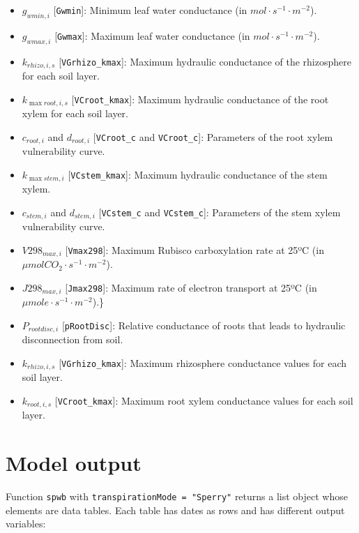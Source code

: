 \documentclass[]{book}
\providecommand{\tightlist}{%
  \setlength{\itemsep}{0pt}\setlength{\parskip}{0pt}}
\begin{document}
\begin{itemize}
\tightlist
\item
  \(g_{wmin,i}\) {[}\texttt{Gwmin}{]}: Minimum leaf water conductance (in \(mol·s^{-1}·m^{-2}\)).
\item
  \(g_{wmax,i}\) {[}\texttt{Gwmax}{]}: Maximum leaf water conductance (in \(mol·s^{-1}·m^{-2}\)).
\item
  \(k_{rhizo,i,s}\) {[}\texttt{VGrhizo\_kmax}{]}: Maximum hydraulic conductance of the rhizosphere for each soil layer.
\item
  \(k_{\max root,i,s}\) {[}\texttt{VCroot\_kmax}{]}: Maximum hydraulic conductance of the root xylem for each soil layer.
\item
  \(c_{root,i}\) and \(d_{root,i}\) {[}\texttt{VCroot\_c} and \texttt{VCroot\_c}{]}: Parameters of the root xylem vulnerability curve.
\item
  \(k_{\max stem,i}\) {[}\texttt{VCstem\_kmax}{]}: Maximum hydraulic conductance of the stem xylem.
\item
  \(c_{stem,i}\) and \(d_{stem,i}\) {[}\texttt{VCstem\_c} and \texttt{VCstem\_c}{]}: Parameters of the stem xylem vulnerability curve.
\item
  \(V298_{max,i}\) {[}\texttt{Vmax298}{]}: Maximum Rubisco carboxylation rate at 25ºC (in \(\mu mol CO_2·s^{-1}·m^{-2}\)).
\item
  \(J298_{max,i}\) {[}\texttt{Jmax298}{]}: Maximum rate of electron transport at 25ºC (in \(\mu mol e ·s^{-1}·m^{-2}\)).\}
\item
  \(P_{rootdisc,i}\) {[}\texttt{pRootDisc}{]}: Relative conductance of roots that leads to hydraulic disconnection from soil.
\item
  \(k_{rhizo,i,s}\) {[}\texttt{VGrhizo\_kmax}{]}: Maximum rhizosphere conductance values for each soil layer.
\item
  \(k_{root,i,s}\) {[}\texttt{VCroot\_kmax}{]}: Maximum root xylem conductance values for each soil layer.
\end{itemize}

\hypertarget{model-output-1}{%
\section{Model output}\label{model-output-1}}

Function \texttt{spwb} with \texttt{transpirationMode\ =\ "Sperry"} returns a list object whose elements are data tables. Each table has dates as rows and has different output variables:
\end{document}
